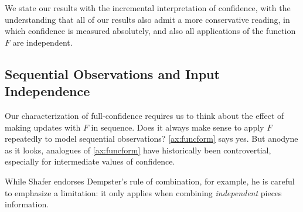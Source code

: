\begin{subappendices}
    We state our results with the incremental interpretation of confidence, with the understanding that all of our results also admit a more conservative reading, in which confidence is measured absolutely, and also all applications of the function $F$ are independent. 


    \subsection{Sequential Observations and Input Independence}

    Our characterization of full-confidence requires us to think 
    about the effect of making updates with $F$ in sequence.
    Does it always make sense to apply $F$ repeatedly to model sequential observations?
    \cref{ax:funcform} says yes.
    But anodyne as it looks, analogues of \cref{ax:funcform} have
    historically been controvertial, especially for intermediate values of confidence.

    While Shafer endorses Dempster's rule of combination, for example,
    he is careful  
    to emphasize a limitation: it only applies when combining
    \emph{independent} pieces information.


\end{subappendices}
